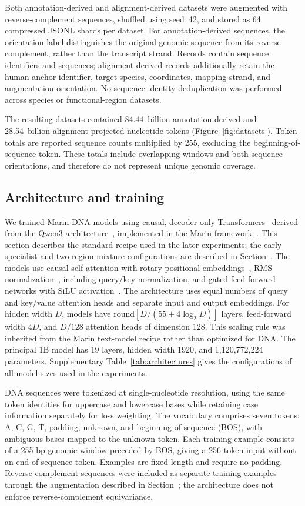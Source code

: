 \documentclass[a4paper,num-refs]{oup-contemporary}
\begin{document}
Both annotation-derived and alignment-derived datasets were augmented
with reverse-complement sequences, shuffled using seed~42, and stored
as 64 compressed JSONL shards per dataset.
For annotation-derived sequences, the orientation label distinguishes
the original genomic sequence from its reverse complement, rather
than the transcript strand.
Records contain sequence identifiers and sequences; alignment-derived
records additionally retain the human anchor identifier, target
species, coordinates, mapping strand, and augmentation orientation.
No sequence-identity deduplication was performed across species or
functional-region datasets.

The resulting datasets contained 84.44~billion annotation-derived and
28.54~billion alignment-projected nucleotide tokens
(Figure~\ref{fig:datasets}). Token totals are reported sequence counts
multiplied by 255, excluding the beginning-of-sequence token.
These totals include overlapping windows and both sequence
orientations, and therefore do not represent unique genomic coverage.

\subsection{Architecture and training}\label{methods:architecture}
We trained Marin DNA models using causal, decoder-only
Transformers~\citep{vaswani2017attention} derived from the Qwen3
architecture~\citep{qwen2025qwen3}, implemented in the Marin
framework~\citep{marin}.
This section describes the standard recipe used in the later experiments;
the early specialist and two-region mixture configurations are described
in Section~.
The models use causal self-attention with rotary positional
embeddings~\citep{su2024roformer}, RMS
normalization~\citep{zhang2019rmsnorm}, including query/key
normalization, and gated feed-forward networks with SiLU
activation~\citep{shazeer2020glu}.
The architecture uses equal numbers of query and key/value
attention heads and separate input and output embeddings.
For hidden width $D$, models have
$\mathrm{round}[D/(55+4\log_2 D)]$ layers, feed-forward width $4D$,
and $D/128$ attention heads of dimension 128.
This scaling rule was inherited from the Marin text-model recipe
rather than optimized for DNA.
The principal 1B model has 19 layers, hidden width 1920, and
1,120,772,224 parameters.
Supplementary Table~\ref{tab:architectures} gives the configurations
of all model sizes used in the experiments.

DNA sequences were tokenized at single-nucleotide resolution,
using the same token identities for uppercase and lowercase bases
while retaining case information separately for loss weighting.
The vocabulary comprises seven tokens: A, C, G, T, padding,
unknown, and beginning-of-sequence (BOS), with ambiguous bases
mapped to the unknown token.
Each training example consists of a 255-bp genomic window
preceded by BOS, giving a 256-token input without an
end-of-sequence token.
Examples are fixed-length and require no padding.
Reverse-complement sequences were included as separate training
examples through the augmentation described in
Section~; the architecture does not
enforce reverse-complement equivariance.
\end{document}
